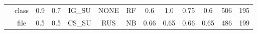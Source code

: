 \begin{table}[H]
{\begin{tabular}{@{}ccccccccccccc@{}}
                                                         & class                  & 0.9        & 0.7           & IG\_SU                   & NONE                       & RF             & 0.6                & 1.0             & 0.75       & 0.6               & 506                & 195           \\
                                                         & file                   & 0.5        & 0.5           & CS\_SU                   & RUS                        & NB             & 0.66               & 0.65            & 0.66       & 0.65              & 486                & 199          
\end{tabular}
}
\end{table}